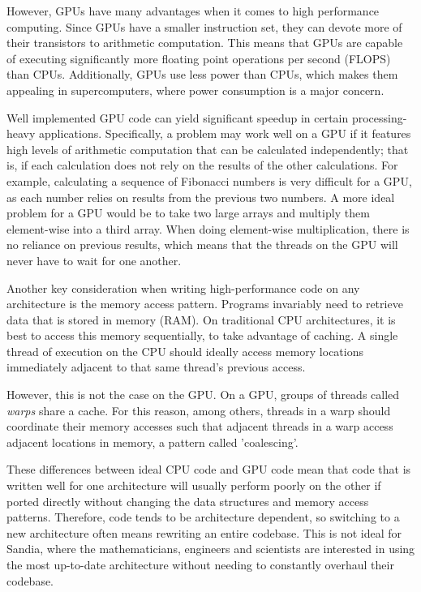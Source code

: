 However, GPUs have many advantages when it comes to high performance computing.
Since GPUs have a smaller instruction set, they can devote more of their
transistors to arithmetic computation. This means that GPUs are capable of
executing significantly more floating point operations per second (FLOPS) than
CPUs. Additionally, GPUs use less power than CPUs, which makes them appealing
in supercomputers, where power consumption is a major concern.

Well implemented GPU code can yield significant speedup in certain
processing-heavy applications. Specifically, a problem may work well on a GPU if
it features high levels of arithmetic computation that can be calculated
independently; that is, if each calculation does not rely on the results of the other
calculations. For example, calculating a sequence of Fibonacci numbers is very
difficult for a GPU, as each number relies on results from the previous two numbers. A 
more ideal problem for a GPU would be to take two large arrays
and multiply them element-wise into a third array. When doing element-wise multiplication,
there is no reliance on previous results, which means that the threads on the GPU will
never have to wait for one another.

Another key consideration when writing high-performance code on any architecture
is the memory access pattern. Programs invariably need to retrieve data that is
stored in memory (RAM). On traditional CPU architectures, it is best to access
this memory sequentially, to take advantage of caching. A single thread of
execution on the CPU should ideally access memory locations immediately adjacent
to that same thread's previous access.

However, this is not the case on the GPU. On a GPU, groups of threads called
\emph{warps} share a cache. For this reason, among others, threads in a warp
should coordinate their memory accesses such that adjacent threads in
a warp access adjacent locations in memory, a pattern called 'coalescing'.

These differences between ideal CPU code and GPU code mean that code that is
written well for one architecture will usually perform poorly on the other if
ported directly without changing the data structures and memory access patterns.
Therefore, code tends to be architecture dependent, so switching to a new
architecture often means rewriting an entire codebase. This is not ideal for
Sandia, where the mathematicians, engineers and scientists are interested in 
using the most up-to-date architecture without
needing to constantly overhaul their codebase.

